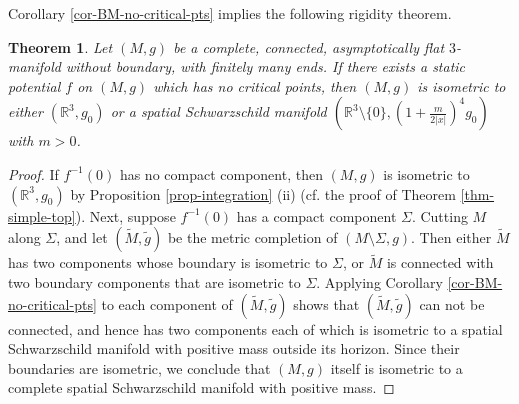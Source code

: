 \documentclass[12pt]{amsart}
\newtheorem{thm}{Theorem}[section]
\theoremstyle{remark}
\newtheorem{remark}{Remark}[section]
\numberwithin{equation}{section}
\newcommand{\R}{\mathbb R}
\begin{document}
Corollary \ref{cor-BM-no-critical-pts} implies the following rigidity theorem. 


\begin{thm} \label{thm-rigidity-no-critical-point}
Let $(M,g)$ be a complete, connected, asymptotically flat $3$-manifold without boundary, with finitely many ends.
If there exists  a  static potential  $f$ on $(M, g)$ which has no critical points,
then $(M, g)$ is  isometric  to either $(\R^3, g_0)$ or  a  spatial Schwarzschild manifold
$ ( \R^3 \setminus \{ 0  \},  ( 1 + \frac{  m}{ 2 | x | }  )^4 g_0 ) $ with $m>0$.
\end{thm}
\begin{proof}
If $f^{-1}(0)$ has no compact component, then $(M,g)$ is isometric to $(\R^3,g_0)$ by Proposition \ref{prop-integration} (ii)
(cf. the proof of  Theorem \ref{thm-simple-top}).
Next, suppose $f^{-1}(0)$ has a  compact component $\Sigma$.
Cutting $M$ along $\Sigma$, and let $ (\tilde{M}, \tilde{g} ) $ be the metric completion  of   $( M\setminus \Sigma, g)$.
Then either $\tilde{M}$  has two components  whose boundary is isometric to $\Sigma$,
or $\tilde{M}$ is  connected  with two boundary components that are isometric to $\Sigma$.
Applying   Corollary \ref{cor-BM-no-critical-pts} to each component of $(\tilde{M}, \tilde{g})$ shows
that $(\tilde{M}, \tilde{g})$ can not be connected, and hence has two components each of which is  isometric to a spatial Schwarzschild manifold
with positive mass outside its horizon. Since their boundaries are isometric, we conclude that
$(M, g)$ itself is isometric to a complete  spatial Schwarzschild manifold
with positive mass.
\end{proof}


\end{document}
